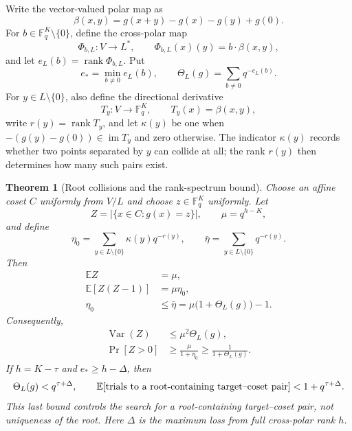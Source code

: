 \documentclass[11pt]{article}
\newtheorem{theorem}{Theorem}
\newcommand{\F}{\mathbb F}
\newcommand{\rank}{\operatorname{rank}}
\begin{document}
Write the vector-valued polar map as
\[
 \beta(x,y)=g(x+y)-g(x)-g(y)+g(0).
\]
For $b\in\F_q^K\setminus\{0\}$, define the cross-polar map
\begin{equation}\label{eq:cross-polar-map}
 \Phi_{b,L}:V\longrightarrow L^*,
 \qquad \Phi_{b,L}(x)(y)=b\cdot\beta(x,y),
\end{equation}
and let $e_L(b)=\rank\Phi_{b,L}$.  Put
\begin{equation}\label{eq:theta-def}
 e_* = \min_{b\ne0}e_L(b),
 \qquad
 \Theta_L(g)=\sum_{b\ne0}q^{-e_L(b)}.
\end{equation}
For $y\in L\setminus\{0\}$, also define the directional derivative
\begin{equation}\label{eq:directional-map}
 T_y:V\longrightarrow\F_q^K,
 \qquad T_y(x)=\beta(x,y),
\end{equation}
write $r(y)=\rank T_y$, and let
$\kappa(y)$ be one when $-(g(y)-g(0))\in\operatorname{im}T_y$ and zero
otherwise.  The indicator $\kappa(y)$ records whether two points separated by
$y$ can collide at all; the rank $r(y)$ then determines how many such pairs
exist.

\begin{theorem}[Root collisions and the rank-spectrum bound]
\label{thm:coset-success}
Choose an affine coset $C$ uniformly from $V/L$ and choose
$z\in\F_q^K$ uniformly.  Let
\[
 Z=|\{x\in C:g(x)=z\}|,
 \qquad \mu=q^{h-K},
\]
and define
\begin{equation}\label{eq:eta-def}
 \eta_0=\sum_{y\in L\setminus\{0\}}\kappa(y)q^{-r(y)},
 \qquad
 \bar\eta=\sum_{y\in L\setminus\{0\}}q^{-r(y)}.
\end{equation}
Then
\begin{align}
 \mathbb E Z&=\mu,\label{eq:EZ}\\
 \mathbb E[Z(Z-1)]&=\mu\eta_0,\label{eq:factorial-moment}\\
 \eta_0&\le\bar\eta
 =\mu\bigl(1+\Theta_L(g)\bigr)-1.\label{eq:eta-spectrum}
\end{align}
Consequently,
\begin{align}
 \operatorname{Var}(Z)&\le\mu^2\Theta_L(g),\label{eq:theta-var}\\
 \Pr[Z>0]&\ge\frac{\mu}{1+\eta_0}
 \ge\frac{1}{1+\Theta_L(g)}.\label{eq:coset-success}
\end{align}
If $h=K-\tau$ and $e_*\ge h-\Delta$, then
\begin{equation}\label{eq:defect-retry}
 \Theta_L(g)<q^{\tau+\Delta},
 \qquad
 \mathbb E[\textnormal{trials to a root-containing target--coset pair}]
 <1+q^{\tau+\Delta}.
\end{equation}
This last bound controls the search for a root-containing target--coset pair,
not uniqueness of the root.
Here $\Delta$ is the maximum loss from full cross-polar rank $h$.
\end{theorem}
\end{document}
